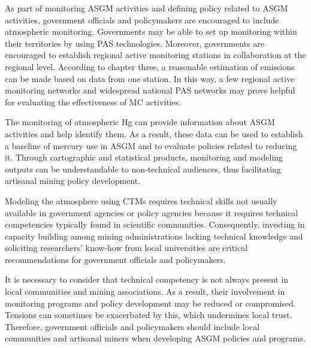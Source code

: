 As part of monitoring ASGM activities and defining policy related to ASGM activities, government officials and policymakers are encouraged to include atmospheric monitoring.  Governments may be able to set up monitoring within their territories by using PAS technologies. Moreover, governments are encouraged to establish regional active monitoring stations in collaboration at the regional level. According to chapter three, a reasonable estimation of emissions can be made based on data from one station. In this way, a few regional active monitoring networks and widespread national PAS networks may prove helpful for evaluating the effectiveness of MC activities.
  
The monitoring of atmospheric Hg can provide information about ASGM activities and help identify them. As a result, these data can be used to establish a baseline of mercury use in ASGM and to evaluate policies related to reducing it. Through cartographic and statistical products, monitoring and modeling outputs can be understandable to non-technical audiences, thus facilitating artisanal mining policy development. 

Modeling the atmosphere using CTMs requires technical skills not usually available in government agencies or policy agencies because it requires technical competencies typically found in scientific communities. Consequently, investing in capacity building among mining administrations lacking technical knowledge and soliciting researchers' know-how from local universities are critical recommendations for government officials and policymakers.  
 
It is necessary to consider that technical competency is not always present in local communities and mining associations. As a result, their involvement in monitoring programs and policy development may be reduced or compromised. Tensions can sometimes be exacerbated by this, which undermines local trust. Therefore, government officials and policymakers should include local communities and artisanal miners when developing ASGM policies and programs. 


